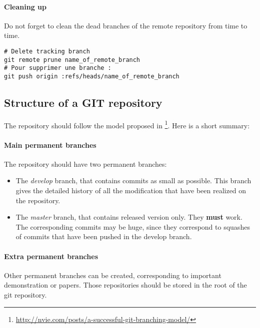 \paragraph{Cleaning up}

Do not forget to clean the dead branches of the remote repository from time to time.
\begin{verbatim}
# Delete tracking branch
git remote prune name_of_remote_branch
# Pour supprimer une branche :
git push origin :refs/heads/name_of_remote_branch
\end{verbatim}


\subsection{Structure of a GIT repository}
The repository should follow the model proposed in \footnote{\url{http://nvie.com/posts/a-successful-git-branching-model/}}.
Here is a short summary:
\paragraph{Main permanent branches}
The repository should have two permanent branches:
\begin{itemize}
\item The \textit{develop} branch, that contains commits as small as possible. This branch gives the detailed history of all the modification that have been realized on the repository. 
\item The \textit{master} branch, that contains released version only. They \textbf{must} work. The corresponding commits may be huge, since they correspond to squashes of commits that have been pushed in the develop branch.
\end{itemize}

\paragraph{Extra permanent branches}
Other permanent branches can be created, corresponding to important demonstration or papers.
Those repositories should be stored in the root of the git repository.

